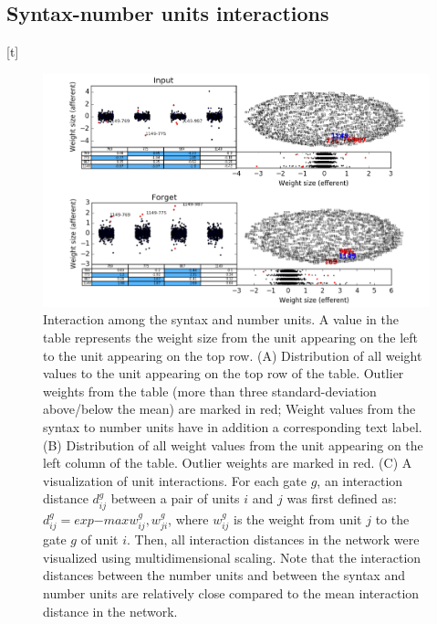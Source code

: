 \subsection{Syntax-number units interactions}[t]
\begin{figure}
\centering
\includegraphics[width=\textwidth]{Figures/Figure7_interactions.png}
\caption{Interaction among the syntax and number units. A value in the table represents the weight size from the unit appearing on the left to the unit appearing on the top row. (A) Distribution of all weight values to the unit appearing on the top row of the table. Outlier weights from the table (more than three standard-deviation above/below the mean) are marked in red; Weight values from the syntax to number units have in addition a corresponding text label. (B) Distribution of all weight values from the unit appearing on the left column of the table. Outlier weights are marked in red. (C)  A visualization of unit interactions. For each gate $g$, an interaction distance $d_{ij}^g$ between a pair of units $i$ and $j$ was first defined as: $d_{ij}^g=exp{-max{w_{ij}^g, w_{ji}^g}}$, where $w_{ij}^g$ is the weight from unit $j$ to the gate $g$ of unit $i$. Then, all interaction distances in the network were visualized using multidimensional scaling. Note that the interaction distances between the number units and between the syntax and number units are relatively close compared to the mean interaction distance in the network.}
\end{figure}

